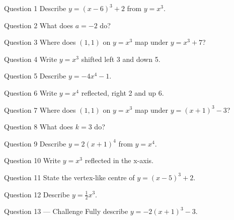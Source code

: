 \documentclass[11pt]{article}
\begin{document}
\begin{qbox}{Question 1}
Describe $y=(x-6)^3+2$ from $y=x^3$.\workspace{2.4cm}
\end{qbox}

\begin{qbox}{Question 2}
What does $a=-2$ do?\workspace{2.4cm}
\end{qbox}

\begin{qbox}{Question 3}
Where does $(1,1)$ on $y=x^3$ map under $y=x^3+7$?\workspace{2.4cm}
\end{qbox}

\begin{qbox}{Question 4}
Write $y=x^3$ shifted left 3 and down 5.\workspace{2.4cm}
\end{qbox}

\begin{qbox}{Question 5}
Describe $y=-4x^4-1$.\workspace{2.4cm}
\end{qbox}

\begin{qbox}{Question 6}
Write $y=x^4$ reflected, right 2 and up 6.\workspace{2.4cm}
\end{qbox}

\begin{qbox}{Question 7}
Where does $(1,1)$ on $y=x^3$ map under $y=(x+1)^3-3$?\workspace{2.4cm}
\end{qbox}

\begin{qbox}{Question 8}
What does $k=3$ do?\workspace{2.4cm}
\end{qbox}

\begin{qbox}{Question 9}
Describe $y=2(x+1)^4$ from $y=x^4$.\workspace{2.4cm}
\end{qbox}

\begin{qbox}{Question 10}
Write $y=x^3$ reflected in the x-axis.\workspace{2.4cm}
\end{qbox}

\begin{qbox}{Question 11}
State the vertex-like centre of $y=(x-5)^3+2$.\workspace{2.4cm}
\end{qbox}

\begin{qbox}{Question 12}
Describe $y=\tfrac12 x^3$.\workspace{2.4cm}
\end{qbox}

\begin{qbox}{Question 13 --- Challenge}
Fully describe $y=-2(x+1)^3-3$.\workspace{3cm}
\end{qbox}
\end{document}
